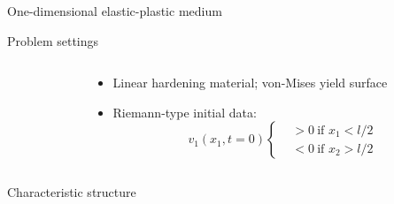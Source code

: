 
\begin{frame}{One-dimensional elastic-plastic medium}
  \begin{block}{\footnotesize Problem settings}
    \vspace{-0.2cm}
    \begin{columns}
      \begin{column}{0.49\textwidth}
        \centering
        
      \end{column}
      \begin{column}{0.49\textwidth}
        \begin{footnotesize}
          \begin{itemize}
          \item Linear hardening material; von-Mises yield surface
          \item Riemann-type initial data:
            \begin{equation*}
              v_1(x_1,t=0) \left\lbrace
                \begin{aligned}
                  &>0 \: \text{if } x_1<l/2\\
                  &<0 \: \text{if } x_2>l/2
                \end{aligned}\right.
            \end{equation*}
          \end{itemize}
        \end{footnotesize}
      \end{column}
    \end{columns}
  \end{block}
  \begin{block}{\footnotesize Characteristic structure \cite{Wang}}
    \begin{columns}
      \begin{column}{0.49\textwidth}
\end{column}
\end{columns}
\end{block}
\end{frame}
